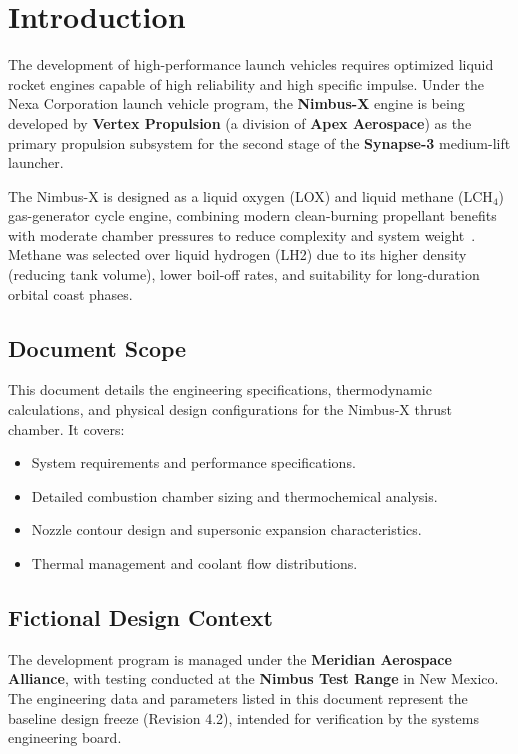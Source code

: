 \section{Introduction}
The development of high-performance launch vehicles requires optimized liquid rocket engines capable of high reliability and high specific impulse. Under the Nexa Corporation launch vehicle program, the \textbf{Nimbus-X} engine is being developed by \textbf{Vertex Propulsion} (a division of \textbf{Apex Aerospace}) as the primary propulsion subsystem for the second stage of the \textbf{Synapse-3} medium-lift launcher. 

The Nimbus-X is designed as a liquid oxygen (LOX) and liquid methane ($\text{LCH}_4$) gas-generator cycle engine, combining modern clean-burning propellant benefits with moderate chamber pressures to reduce complexity and system weight~\cite{Sutton2016}. Methane was selected over liquid hydrogen (LH2) due to its higher density (reducing tank volume), lower boil-off rates, and suitability for long-duration orbital coast phases.

\subsection{Document Scope}
This document details the engineering specifications, thermodynamic calculations, and physical design configurations for the Nimbus-X thrust chamber. It covers:
\begin{itemize}
    \item System requirements and performance specifications.
    \item Detailed combustion chamber sizing and thermochemical analysis.
    \item Nozzle contour design and supersonic expansion characteristics.
    \item Thermal management and coolant flow distributions.
\end{itemize}

\subsection{Fictional Design Context}
The development program is managed under the \textbf{Meridian Aerospace Alliance}, with testing conducted at the \textbf{Nimbus Test Range} in New Mexico. The engineering data and parameters listed in this document represent the baseline design freeze (Revision 4.2), intended for verification by the systems engineering board.
